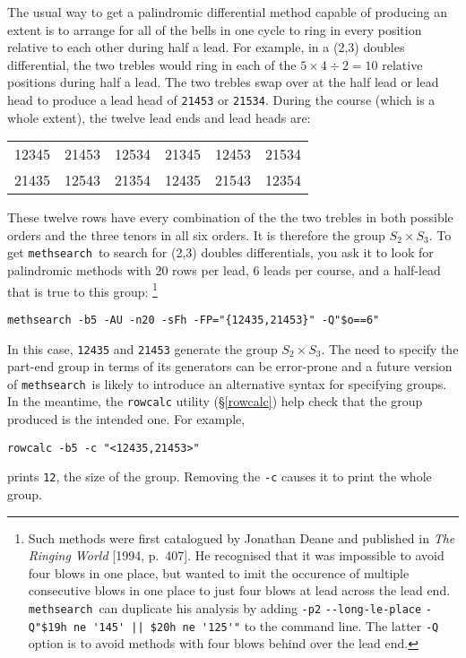 \documentclass[a4paper,11pt,oneside]{book}
\makeatletter
\newcommand{\ttcmdidx}[1]{\texttt{#1}\index{#1@{\texttt{#1}}}}
\def\methsearch{\texttt{meth\-search}}
\newcommand{\sref}[1]{\hyperref[#1]{\S\ref{#1}}}
\makeatother
\begin{document}
The usual way to get a palindromic differential method capable of producing 
an extent is to arrange for all of the bells in one cycle to ring in every 
position relative to each other during half a lead.  For example, in a 
(2,3) doubles differential, the two trebles would ring in each of the 
$\textrm{5}\times\textrm{4}\div\textrm{2} = \textrm{10}$ relative positions 
during half a lead.  The two trebles swap over at the half lead or lead head
to produce a lead head of \verb+21453+ or \verb+21534+.  During the course
(which is a whole extent), the twelve lead ends and lead heads are:
\begin{center}
\begin{tabular}{cccccc}
12345&21453&12534&21345&12453&21534\\
21435&12543&21354&12435&21543&12354\\
\end{tabular}
\end{center}
These twelve rows have every combination of the the two trebles in both 
possible orders and the three tenors in all six orders.  It is therefore
the group $S_2 \times S_3$.  
To get \methsearch\ to search for (2,3) doubles differentials, you ask
it to look for palindromic methods with 20 rows per lead, 6 leads per course, 
and a half-lead that is true to this group:%
\footnote{Such methods were first catalogued by Jonathan 
Deane and published in \textit{The Ringing World}
[1994, p.~407].  He recognised that it was impossible to avoid four blows
in one place, but wanted to imit the occurence of multiple consecutive 
blows in one place to just four blows at lead across the lead end.  
\methsearch\ can duplicate his analysis by adding \verb+-p2+ 
\verb+--long-le-place+ \verb+-Q"$19h ne '145' || $20h ne '125'"+ 
to the command line.  The latter \verb+-Q+
option is to avoid methods with four blows behind over the lead end.}%
\begin{Verbatim}
methsearch -b5 -AU -n20 -sFh -FP="{12435,21453}" -Q"$o==6"
\end{Verbatim}
In this case, \verb+12435+ and \verb+21453+ generate the group 
$S_2 \times S_3$.   The need to specify the part-end group in terms
of its generators can be error-prone 
and a future version of \methsearch\ is likely to introduce an alternative 
syntax for specifying groups.  
In the meantime, the \ttcmdidx{rowcalc} utility (\sref{rowcalc})
help check that the group produced is the intended one.  For example,
\begin{Verbatim}
rowcalc -b5 -c "<12435,21453>"
\end{Verbatim}
prints \verb+12+, the size of the group.  Removing the \verb+-c+ causes it
to print the whole group.
\end{document}
